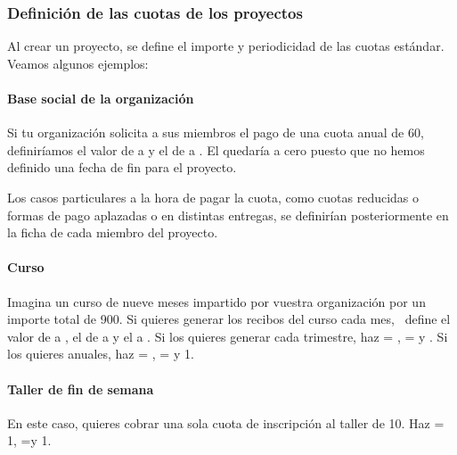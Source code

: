 \subsubsection{Definición de las cuotas de los proyectos}
Al crear un proyecto, se define el importe y periodicidad de las cuotas
estándar. Veamos algunos ejemplos:

\paragraph{Base social de la organización}
Si tu organización solicita a sus miembros el pago de una cuota anual
de 60{\texteuro}, definiríamos el valor de
 a  y el de
 a
. El 
quedaría a cero puesto que no hemos definido una fecha de fin para el
proyecto. 

Los casos particulares a la hora de pagar la cuota, como cuotas
reducidas o formas de pago aplazadas o en distintas entregas, se
definirían posteriormente en la ficha de cada miembro del proyecto.

\paragraph[Curso]{Curso}
Imagina un curso de nueve meses impartido por vuestra organización por
un importe total de 900{\texteuro}. Si quieres generar los recibos del
curso cada mes, \ define el valor de  a
, el de  a y el
a . Si
los quieres generar cada trimestre, haz  =
,  = y
 . Si
los quieres anuales, haz  =
,  = y  1.

\paragraph{Taller de fin de semana}
En este caso, quieres cobrar una sola cuota de inscripción al taller
de 10{\texteuro}. Haz  =
1, 
=y  1.


